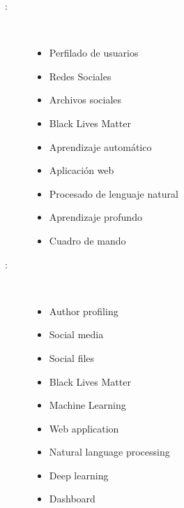 \begin{multicols}{2}
\begin{description}
\item [\palabraschaveprincipal:] \mbox{} \\[-20pt]
\begin{itemize}
    \item Perfilado de usuarios
    \item Redes Sociales
    \item Archivos sociales
    \item Black Lives Matter
    \item Aprendizaje automático
    \item Aplicación web
    \item Procesado de lenguaje natural
    \item Aprendizaje profundo
    \item Cuadro de mando
\end{itemize}
\end{description}

\begin{description}
\item [\palabraschavesecundaria:] \mbox{} \\[-20pt]
 \begin{itemize}
    \item Author profiling
    \item Social media
    \item Social files
    \item Black Lives Matter
    \item Machine Learning
    \item Web application
    \item Natural language processing
    \item Deep learning
    \item Dashboard
\end{itemize}
\end{description}
\end{multicols}
